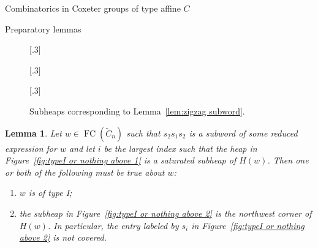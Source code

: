 \documentclass[11pt]{amsart}
\newtheorem{lemma}[theorem]{Lemma}
\theoremstyle{definition}
\numberwithin{equation}{section}
\newcommand{\C}{\widetilde{C}}
\renewcommand{\(}{\left(}
\renewcommand{\)}{\right)}
\DeclareMathOperator{\FC}{FC}
\newcommand\xxaxis{0}
\newcommand\yyaxis{90}
\newcommand\heapblock[3]{\fill[draw=black, fill=gray!30, rounded corners, line width=1.1pt, shift={(\xxaxis:#1)},shift={(\yyaxis:#2)}] (-1,-0.5) rectangle (1,0.5);\node at (#1,#2) {$#3$};}
\newcommand\heapblank[2]{\fill[fill=white, dotted, draw=black, line width=1.1pt, rounded corners, shift={(\xxaxis:#1)},shift={(\yyaxis:#2)}] (-1,-0.5) rectangle (1,0.5);}
\begin{document}
\begin{section}{Combinatorics in Coxeter groups of type affine $C$}
\begin{subsection}{Preparatory lemmas}
\begin{figure}[!ht]
\subcaptionbox{\label{fig:zigzag subword 1}}[.3\textwidth]{
}
\subcaptionbox{\label{fig:zigzag subword 2}}[.3\textwidth]{
}
\subcaptionbox{\label{fig:zigzag subword 3}}[.3\textwidth]{
}
\caption{Subheaps corresponding to Lemma~\ref{lem:zigzag subword}.}
\end{figure}

\begin{lemma}\label{lem:typeI or nothing above}
Let $w \in \FC(\C_{n})$ such that $s_{2}s_{1}s_{2}$ is a subword of some reduced expression for $w$ and let $i$ be the largest index such that the heap in Figure~\ref{fig:typeI or nothing above 1} is a saturated subheap of $H(w)$.  Then one or both of the following must be true about $w$:
\begin{enumerate}
\item $w$ is of type I; 
\item the subheap in Figure~\ref{fig:typeI or nothing above 2} is the northwest corner of $H(w)$.  In particular, the entry labeled by $s_{i}$ in Figure~\ref{fig:typeI or nothing above 2} is not covered.
\end{enumerate}
\end{lemma}


\end{subsection}
\end{section}
\end{document}
